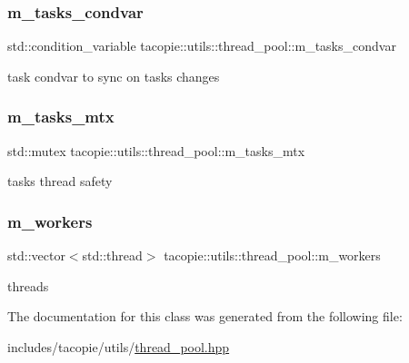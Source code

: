 \subsubsection{\texorpdfstring{m\+\_\+tasks\+\_\+condvar}{m\_tasks\_condvar}}
{\footnotesize\ttfamily std\+::condition\+\_\+variable tacopie\+::utils\+::thread\+\_\+pool\+::m\+\_\+tasks\+\_\+condvar\hspace{0.3cm}{\ttfamily [private]}}

task condvar to sync on tasks changes \mbox{\label{classtacopie_1_1utils_1_1thread__pool_aeae956282edc4d2171ee2e408cb1189f}} 
\subsubsection{\texorpdfstring{m\+\_\+tasks\+\_\+mtx}{m\_tasks\_mtx}}
{\footnotesize\ttfamily std\+::mutex tacopie\+::utils\+::thread\+\_\+pool\+::m\+\_\+tasks\+\_\+mtx\hspace{0.3cm}{\ttfamily [private]}}

tasks thread safety \mbox{\label{classtacopie_1_1utils_1_1thread__pool_a5250ed4fbe845c69e3e28cb7edf4d796}} 
\subsubsection{\texorpdfstring{m\+\_\+workers}{m\_workers}}
{\footnotesize\ttfamily std\+::vector$<$std\+::thread$>$ tacopie\+::utils\+::thread\+\_\+pool\+::m\+\_\+workers\hspace{0.3cm}{\ttfamily [private]}}

threads 

The documentation for this class was generated from the following file\+:\begin{DoxyCompactItemize}
\item 
includes/tacopie/utils/\hyperlink{thread__pool_8hpp}{thread\+\_\+pool.\+hpp}\end{DoxyCompactItemize}
